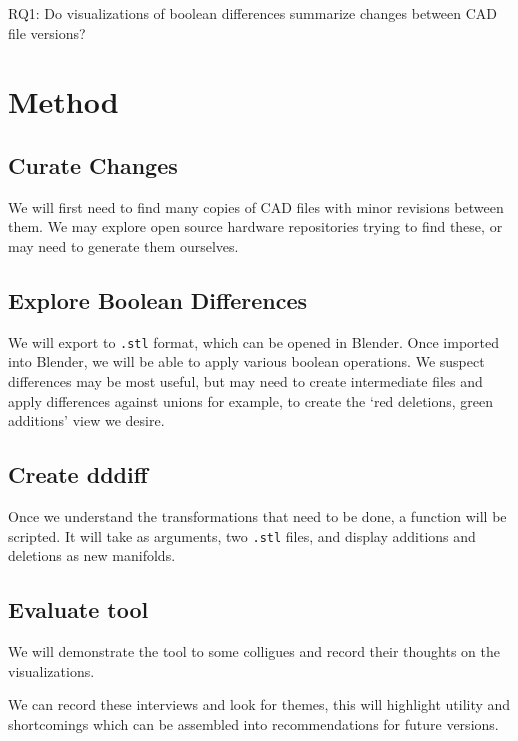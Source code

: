 \documentclass[sigconf]{acmart}
\begin{document}
RQ1: Do visualizations of boolean differences summarize changes between CAD file versions?

\section{Method}



\subsection{Curate Changes}

We will first need to find many copies of CAD files with minor revisions between them.
We may explore open source hardware repositories trying to find these, or may need to generate them ourselves.

\subsection{Explore Boolean Differences}

We will export to \texttt{.stl} format, which can be opened in Blender.
Once imported into Blender, we will be able to apply various boolean operations.
We suspect differences may be most useful, but may need to create intermediate files and apply differences against unions for example, to create the `red deletions, green additions' view we desire.

\subsection{Create dddiff}

Once we understand the transformations that need to be done, a function will be scripted.
It will take as arguments, two \texttt{.stl} files, and display additions and deletions as new manifolds.

\subsection{Evaluate tool}

We will demonstrate the tool to some colligues and record their thoughts on the visualizations.

We can record these interviews and look for themes, this will highlight utility and shortcomings which can be assembled into recommendations for future versions.
\end{document}
